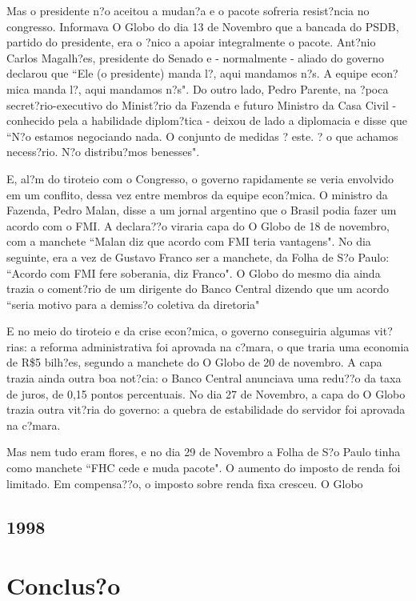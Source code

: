 \documentclass{article}
\begin{document}
Mas o presidente n?o aceitou a mudan?a e o pacote sofreria resist?ncia no congresso. Informava O Globo do dia 13 de Novembro que a bancada do PSDB, partido do presidente, era o ?nico a apoiar integralmente o pacote. Ant?nio Carlos Magalh?es, presidente do Senado e - normalmente - aliado do governo declarou que ``Ele (o presidente) manda l?, aqui mandamos n?s. A equipe econ?mica manda l?, aqui mandamos n?s". Do outro lado, Pedro Parente, na ?poca secret?rio-executivo do Minist?rio da Fazenda e futuro Ministro da Casa Civil - conhecido pela a habilidade diplom?tica - deixou de lado a diplomacia e disse que ``N?o estamos negociando nada. O conjunto de medidas ? este. ? o que achamos necess?rio. N?o distribu?mos benesses".

E, al?m do tiroteio com o Congresso, o governo rapidamente se veria envolvido em um conflito, dessa vez entre membros da equipe econ?mica. O ministro da Fazenda, Pedro Malan, disse a um jornal argentino que o Brasil podia fazer um acordo com o FMI. A declara??o viraria capa do O Globo de 18 de novembro, com a manchete ``Malan diz que acordo com FMI teria vantagens". No dia seguinte, era a vez de Gustavo Franco ser a manchete, da Folha de S?o Paulo: ``Acordo com FMI fere soberania, diz Franco". O Globo do mesmo dia ainda trazia o coment?rio de um dirigente do Banco Central dizendo que um acordo ``seria motivo para a demiss?o coletiva da diretoria"   

E no meio do tiroteio e da crise econ?mica, o governo conseguiria algumas vit?rias: a reforma administrativa foi aprovada na c?mara, o que traria uma economia de R\$5 bilh?es, segundo a manchete do O Globo de 20 de novembro. A capa trazia ainda outra boa not?cia: o Banco Central anunciava uma redu??o da taxa de juros, de 0,15 pontos percentuais. No dia 27 de Novembro, a capa do O Globo trazia outra vit?ria do governo: a quebra de estabilidade do servidor foi aprovada na c?mara.

Mas nem tudo eram flores, e no dia 29 de Novembro a Folha de S?o Paulo tinha como manchete ``FHC cede e muda pacote". O aumento do imposto de renda foi limitado. Em compensa??o, o imposto sobre renda fixa cresceu. O Globo

 

\subsection*{1998}

\section{Conclus?o}
\end{document}
